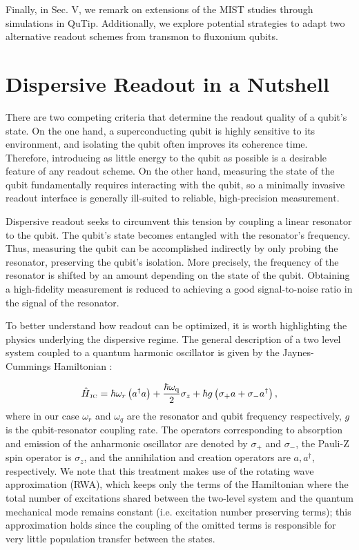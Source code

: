 \documentclass[
 reprint,
 superscriptaddress,
 bibnotes,
 amsmath,
 amssymb,
 aps,
 prb,
 citeautoscript,
 floatfix,
]{revtex4-2}
\newcommand{\freq}{\omega_\text{q}}
\begin{document}
Finally, in Sec. V, we remark on extensions of the MIST studies through simulations in QuTip. Additionally, we explore potential strategies to adapt two alternative readout schemes from transmon to fluxonium qubits. 


\section{\label{sec2} Dispersive Readout in a Nutshell}

There are two competing criteria that determine the readout quality of a qubit's state. On the one hand, a superconducting qubit is highly sensitive to its environment, and isolating the qubit often improves its coherence time. Therefore, introducing as little energy to the qubit as possible is a desirable feature of any readout scheme. On the other hand, measuring the state of the qubit fundamentally requires interacting with the qubit, so a minimally invasive readout interface is generally ill-suited to reliable, high-precision measurement. 

Dispersive readout seeks to circumvent this tension by coupling a linear resonator to the qubit. The qubit's state becomes entangled with the resonator's frequency. Thus, measuring the qubit can be accomplished indirectly by only probing the resonator, preserving the qubit's isolation. More precisely, the frequency of the resonator is shifted by an amount depending on the state of the qubit. Obtaining a high-fidelity measurement is reduced to achieving a good signal-to-noise ratio in the signal of the resonator.

To better understand how readout can be optimized, it is worth highlighting the physics underlying the dispersive regime. The general description of a two level system coupled to a quantum harmonic oscillator is given by the Jaynes-Cummings Hamiltonian \cite{Oliver}:

\begin{equation}
\Hat{H}_{\mbox{\tiny{JC}}} = \hbar \omega_r \left( a^{\dagger}a \right) + \frac{\hbar \freq}{2}\sigma_z + \hbar g \left( \sigma_{+}a + \sigma_{-}a^{\dagger}\right),
\label{Eq:JCH}
\end{equation}
where in our case $\omega_r$ and $\omega_q$ are the resonator and qubit frequency respectively, $g$ is the qubit-resonator coupling rate. The operators corresponding to absorption and emission of the anharmonic oscillator are denoted by $\sigma_{+}$ and $\sigma_{-}$, the Pauli-Z spin operator is $\sigma_z$, and the annihilation and creation operators are $a, a^{\dagger}$, respectively. We note that this treatment makes use of the rotating wave approximation (RWA), which keeps only the terms of the Hamiltonian where the total number of excitations shared between the two-level system and the quantum mechanical mode remains constant (i.e. excitation number preserving terms); this approximation holds since the coupling of the omitted terms is responsible for very little population transfer between the states. 
\end{document}
